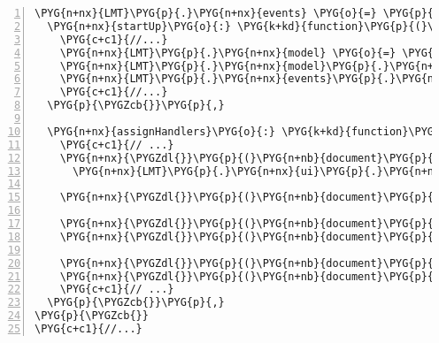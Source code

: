 \begin{Verbatim}[commandchars=\\\{\},numbers=left,stepnumber=1,codes={\catcode`\$=3\catcode`\^=7\catcode`\_=8}]
\PYG{n+nx}{LMT}\PYG{p}{.}\PYG{n+nx}{events} \PYG{o}{=} \PYG{p}{\PYGZob{}}
  \PYG{n+nx}{startUp}\PYG{o}{:} \PYG{k+kd}{function}\PYG{p}{(}\PYG{p}{)}\PYG{p}{\PYGZob{}}
    \PYG{c+c1}{//...}
    \PYG{n+nx}{LMT}\PYG{p}{.}\PYG{n+nx}{model} \PYG{o}{=} \PYG{k}{new} \PYG{n+nx}{LMT}\PYG{p}{.}\PYG{n+nx}{objects}\PYG{p}{.}\PYG{n+nx}{Model}\PYG{p}{(}\PYG{p}{)}\PYG{p}{;}
    \PYG{n+nx}{LMT}\PYG{p}{.}\PYG{n+nx}{model}\PYG{p}{.}\PYG{n+nx}{init}\PYG{p}{(}\PYG{p}{)}\PYG{p}{;}
    \PYG{n+nx}{LMT}\PYG{p}{.}\PYG{n+nx}{events}\PYG{p}{.}\PYG{n+nx}{assignHandlers}\PYG{p}{(}\PYG{p}{)}\PYG{p}{;}
    \PYG{c+c1}{//...}
  \PYG{p}{\PYGZcb{}}\PYG{p}{,}
  
  \PYG{n+nx}{assignHandlers}\PYG{o}{:} \PYG{k+kd}{function}\PYG{p}{(}\PYG{p}{)} \PYG{p}{\PYGZob{}}
    \PYG{c+c1}{// ...}
    \PYG{n+nx}{\PYGZdl{}}\PYG{p}{(}\PYG{n+nb}{document}\PYG{p}{)}\PYG{p}{.}\PYG{n+nx}{on}\PYG{p}{(}\PYG{l+s+s1}{'ShowSelectDatasourceDialog'}\PYG{p}{,}
      \PYG{n+nx}{LMT}\PYG{p}{.}\PYG{n+nx}{ui}\PYG{p}{.}\PYG{n+nx}{html}\PYG{p}{.}\PYG{n+nx}{SelectDatasourceDialog}\PYG{p}{.}\PYG{n+nx}{show}\PYG{p}{)}\PYG{p}{;}    

    \PYG{n+nx}{\PYGZdl{}}\PYG{p}{(}\PYG{n+nb}{document}\PYG{p}{)}\PYG{p}{.}\PYG{n+nx}{on}\PYG{p}{(}\PYG{l+s+s1}{'RepaintModel'}\PYG{p}{,} \PYG{n+nx}{LMT}\PYG{p}{.}\PYG{n+nx}{objects}\PYG{p}{.}\PYG{n+nx}{Model}\PYG{p}{.}\PYG{n+nx}{Repaint}\PYG{p}{)}\PYG{p}{;}

    \PYG{n+nx}{\PYGZdl{}}\PYG{p}{(}\PYG{n+nb}{document}\PYG{p}{)}\PYG{p}{.}\PYG{n+nx}{on}\PYG{p}{(}\PYG{l+s+s1}{'UploadModel'}\PYG{p}{,} \PYG{n+nx}{LMT}\PYG{p}{.}\PYG{n+nx}{com}\PYG{p}{.}\PYG{n+nx}{UploadModel}\PYG{p}{)}\PYG{p}{;}
    \PYG{n+nx}{\PYGZdl{}}\PYG{p}{(}\PYG{n+nb}{document}\PYG{p}{)}\PYG{p}{.}\PYG{n+nx}{on}\PYG{p}{(}\PYG{l+s+s1}{'SimulateModel'}\PYG{p}{,} \PYG{n+nx}{LMT}\PYG{p}{.}\PYG{n+nx}{events}\PYG{p}{.}\PYG{n+nx}{SimulateModel}\PYG{p}{)}\PYG{p}{;}

    \PYG{n+nx}{\PYGZdl{}}\PYG{p}{(}\PYG{n+nb}{document}\PYG{p}{)}\PYG{p}{.}\PYG{n+nx}{on}\PYG{p}{(}\PYG{l+s+s1}{'ReceivedSimulation'}\PYG{p}{,} \PYG{n+nx}{LMT}\PYG{p}{.}\PYG{n+nx}{ui}\PYG{p}{.}\PYG{n+nx}{out}\PYG{p}{.}\PYG{n+nx}{load}\PYG{p}{)}\PYG{p}{;}
    \PYG{n+nx}{\PYGZdl{}}\PYG{p}{(}\PYG{n+nb}{document}\PYG{p}{)}\PYG{p}{.}\PYG{n+nx}{on}\PYG{p}{(}\PYG{l+s+s1}{'ReceivedSimulation'}\PYG{p}{,} \PYG{n+nx}{LMT}\PYG{p}{.}\PYG{n+nx}{ui}\PYG{p}{.}\PYG{n+nx}{html}\PYG{p}{.}\PYG{n+nx}{Toolbar}\PYG{p}{.}\PYG{n+nx}{updateTop}\PYG{p}{)}\PYG{p}{;}
    \PYG{c+c1}{// ...}
  \PYG{p}{\PYGZcb{}}\PYG{p}{,}
\PYG{p}{\PYGZcb{}}  
\PYG{c+c1}{//...}
\end{Verbatim}
